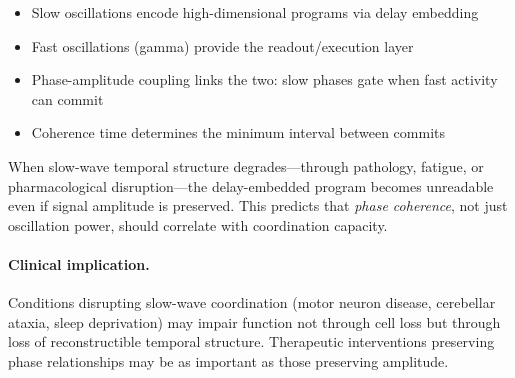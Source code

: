\begin{itemize}
\item Slow oscillations encode high-dimensional programs via delay embedding
\item Fast oscillations (gamma) provide the readout/execution layer
\item Phase-amplitude coupling links the two: slow phases gate when fast activity can commit
\item Coherence time determines the minimum interval between commits
\end{itemize}

When slow-wave temporal structure degrades---through pathology, fatigue, or pharmacological disruption---the delay-embedded program becomes unreadable even if signal amplitude is preserved. This predicts that \emph{phase coherence}, not just oscillation power, should correlate with coordination capacity.

\paragraph{Clinical implication.}
Conditions disrupting slow-wave coordination (motor neuron disease, cerebellar ataxia, sleep deprivation) may impair function not through cell loss but through loss of reconstructible temporal structure. Therapeutic interventions preserving phase relationships may be as important as those preserving amplitude.

%
%
